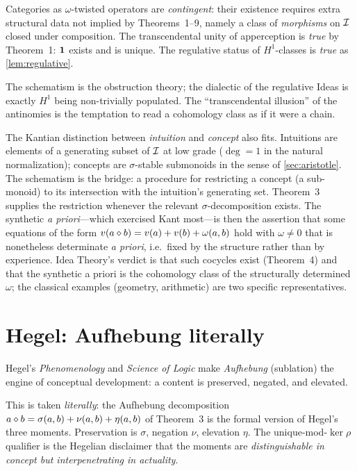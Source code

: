 \formalstatus Categories as $\omega$-twisted operators are
\emph{contingent}: their existence requires extra structural data not
implied by Theorems~1--9, namely a class of \emph{morphisms} on
$\mathcal{I}$ closed under composition. The transcendental unity of
apperception is \emph{true} by Theorem~1: $\mathbf{1}$ exists and is unique.
The regulative status of $H^1$-classes is \emph{true} as
\cref{lem:regulative}.

\litcomment The schematism is the obstruction theory; the dialectic of
the regulative Ideas is exactly $H^1$ being non-trivially populated. The
``transcendental illusion'' of the antinomies is the temptation to read
a cohomology class as if it were a chain.

The Kantian distinction between \emph{intuition} and \emph{concept}
also fits. Intuitions are elements of a generating subset of $\mathcal{I}$
at low grade ($\deg = 1$ in the natural normalization); concepts are
$\sigma$-stable submonoids in the sense of \cref{sec:aristotle}. The
schematism is the bridge: a procedure for restricting a concept (a
sub-monoid) to its intersection with the intuition's generating set.
Theorem~3 supplies the restriction whenever the relevant
$\sigma$-decomposition exists. The synthetic \emph{a priori}---which
exercised Kant most---is then the assertion that some equations of
the form $v(a\mathbin{\diamond} b) = v(a) + v(b) + \omega(a,b)$ hold with
$\omega \neq 0$ that is nonetheless determinate \emph{a priori}, i.e.\
fixed by the structure rather than by experience. Idea Theory's
verdict is that such cocycles exist (Theorem~4) and that the synthetic
a priori is the cohomology class of the structurally determined
$\omega$; the classical examples (geometry, arithmetic) are two
specific representatives.

\section{Hegel: Aufhebung literally}\label{sec:hegel}

 Hegel's \emph{Phenomenology}
\cite{Hegel1807} and \emph{Science of Logic} \cite{Hegel1812} make
\emph{Aufhebung} (sublation) the engine of conceptual development: a
content is preserved, negated, and elevated.

\formalclaim This is taken \emph{literally}: the Aufhebung
decomposition $a\mathbin{\diamond} b = \sigma(a,b)+\nu(a,b)+\eta(a,b)$ of
Theorem~3 is the formal version of Hegel's three moments. Preservation
is $\sigma$, negation $\nu$, elevation $\eta$. The unique-mod-$\ker\rho$
qualifier is the Hegelian disclaimer that the moments are
\emph{distinguishable in concept but interpenetrating in actuality}.

